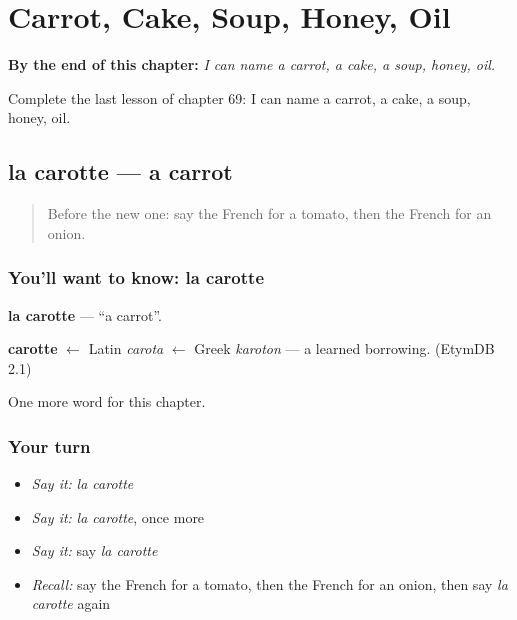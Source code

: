 
\chapter{Carrot, Cake, Soup, Honey, Oil}
\label{ch:fr-carrot-cake-soup-honey-oil}

\begin{chapteropening}
\textbf{By the end of this chapter:} \emph{I can name a carrot, a cake, a soup, honey, oil.}

Complete the last lesson of chapter 69: I can name a carrot, a cake, a soup, honey, oil.
\end{chapteropening}

\section[la carotte]{la carotte — a carrot}

\label{lesson:FR-C69-carotte}



\begin{quote}
Before the new one: say the French for a tomato, then the French for an onion.
\end{quote}

\subsection*{You'll want to know: la carotte}
\textbf{la carotte} — \textquotedblleft{}a carrot\textquotedblright{}.

\begin{cousinweb}
\textbf{carotte} $\leftarrow$ Latin \emph{carota} $\leftarrow$ Greek \emph{karoton} — a learned borrowing. (EtymDB 2.1)
\end{cousinweb}

\begin{grammarlens}[title={What you've built}]
One more word for this chapter.
\end{grammarlens}

\subsection*{Your turn}
\begin{itemize}
\raggedright
  \item \emph{Say it:} \emph{la carotte}
  \item \emph{Say it:} \emph{la carotte}, once more
  \item \emph{Say it:} say \emph{la carotte}
  \item \emph{Recall:} say the French for a tomato, then the French for an onion, then say \emph{la carotte} again
\end{itemize}

